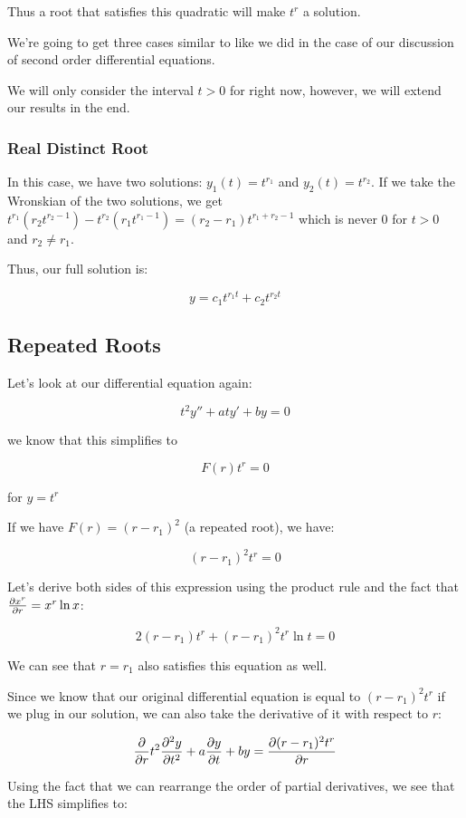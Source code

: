 \documentclass{report}
\begin{document}
Thus a root that satisfies this quadratic will make $t^r$ a solution.

We're going to get three cases similar to like we did in the case of our discussion of second order differential equations.

We will only consider the interval $t > 0$ for right now, however, we will extend our results in the end.

\subsubsection{Real Distinct Root}
In this case, we have two solutions: $y_1(t) = t^{r_1}$ and $y_2(t) = t^{r_2}$. If we take the Wronskian of the two solutions, we get $t^{r_1}(r_2t^{r_2-1}) - t^{r_2}(r_1t^{r_1-1}) = (r_2-r_1)t^{r_1+r_2-1}$ which is never 0 for $t > 0$ and $r_2 \neq r_1$.

Thus, our full solution is:

$$y = c_1t^{r_1 t} + c_2t^{r_2 t}$$

\subsection{Repeated Roots}

Let's look at our differential equation again:

$$t^2y'' + aty' + by = 0$$

we know that this simplifies to

$$F(r)t^r = 0$$

for $y = t^r$

If we have $F(r) = (r-r_1)^2$ (a repeated root), we have:

$$(r-r_1)^2t^r = 0$$

Let's derive both sides of this expression using the product rule and the fact that $\pdv{x^r}{r} = x^r\ln x$:

$$2(r-r_1)t^r + (r-r_1)^2t^r\ln t = 0$$

We can see that $r = r_1$ also satisfies this equation as well.

Since we know that our original differential equation is equal to $(r-r_1)^2t^r$ if we plug in our solution, we can also take the derivative of it with respect to $r$:

$$\pdv{}{r} t^2\pdv[2]{y}{t} + a\pdv{y}{t} + by = \pdv{(r-r_1)^2t^r}{r}$$

Using the fact that we can rearrange the order of partial derivatives, we see that the LHS simplifies to:
\end{document}
